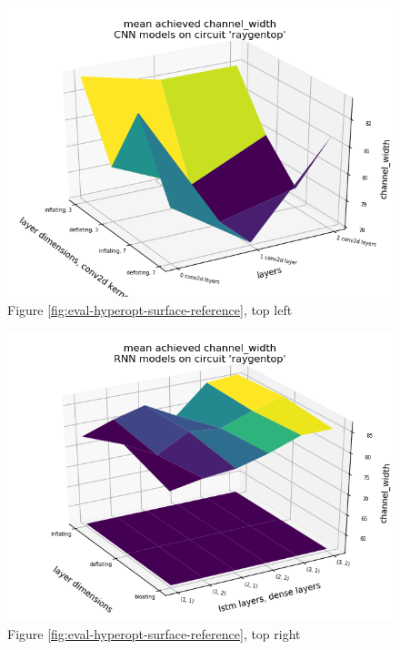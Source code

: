 \begin{figure}[H]
	\includegraphics[width=\linewidth]{plots/cnn-hyperopt-chan-width.png}
	\caption{Figure \ref{fig:eval-hyperopt-surface-reference}, top left}
\end{figure}

\begin{figure}[H]
	\includegraphics[width=\linewidth]{plots/rnn-hyperopt-chan-width-with-reference.png}
	\caption{Figure \ref{fig:eval-hyperopt-surface-reference}, top right}
\end{figure}

